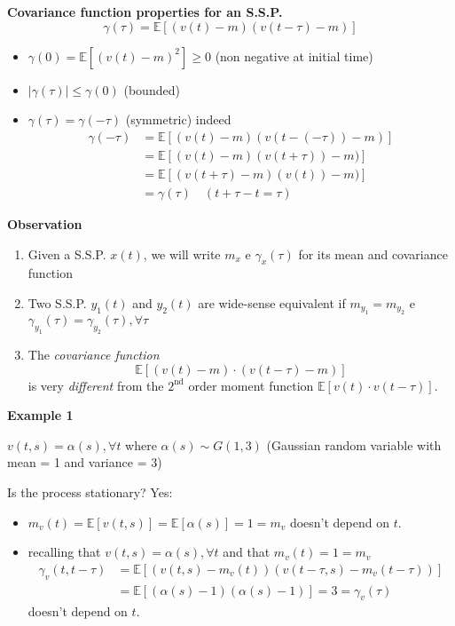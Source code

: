 \documentclass[10pt,a4paper,twoside,openright]{book}
\begin{document}
\textbf{Covariance function properties for an S.S.P.}
$$
\gamma(\tau)=\mathbb{E}[(v(t)-m)(v(t-\tau)-m)]
$$
\begin{itemize}
	\item $\gamma(0)=\mathbb{E}[(v(t)-m)^{2}] \geq 0$ (non negative at initial time)
	\item $|\gamma(\tau)| \leq \gamma(0)$ (bounded)
	\item $\gamma(\tau)=\gamma(-\tau)$ (symmetric) indeed
	\begin{align*}
		\gamma(-\tau)&=\mathbb{E}[(v(t)-m)(v(t-(-\tau))-m)]\\
		&=\mathbb{E}[(v(t)-m)(v(t+\tau))-m)]\\
		&=\mathbb{E}[(v(t+\tau)-m)(v(t))-m)]\\
		&=\gamma(\tau) \quad(t+\tau-t=\tau)
	\end{align*}
\end{itemize}


\textbf{Observation}
\begin{enumerate}
	\item Given a S.S.P. $x(t)$, we will write $m_{x}$ e $\gamma_{x}(\tau)$ for its mean and covariance function
	\item Two S.S.P. $y_{1}(t)$ and $y_{2}(t)$ are wide-sense equivalent if $m_{y_{1}}=m_{y_{2}}$ e $\gamma_{y_{1}}(\tau)=\gamma_{y_{2}}(\tau), \forall \tau$
	\item The \emph{covariance function}
	$$
		\mathbb{E}[(v(t)-m) \cdot(v(t-\tau)-m)]
	$$
	is very \emph{different} from the $2^{\text{nd}}$ order moment function $\mathbb{E}[v(t) \cdot v(t-\tau)]$.
\end{enumerate}

\textbf{Example 1}

$v(t,s)=\alpha (s),\forall t$ where $\alpha (s)\sim G(1,3)$ (Gaussian random variable with mean = 1 and variance = 3)

Is the process stationary? Yes:
\begin{itemize}
	\item $m_{v}(t)=\mathbb{E}[v(t, s)]=\mathbb{E}[\alpha(s)]=1=m_{v}$ doesn't depend on $t$.
	\item recalling that $v(t, s)=\alpha(s), \forall t$ and that $m_{v}(t)=1=m_{v}$
	\begin{align*}
		\gamma_{v}(t, t-\tau)&=\mathbb{E}[(v(t, s)-m_{v}(t))(v(t-\tau, s)-m_{v}(t-\tau))]\\
		&=\mathbb{E}[(\alpha(s)-1)(\alpha(s)-1)]=3=\gamma_{v}(\tau)
	\end{align*}
	 doesn't depend on $t$.
\end{itemize}
\end{document}
